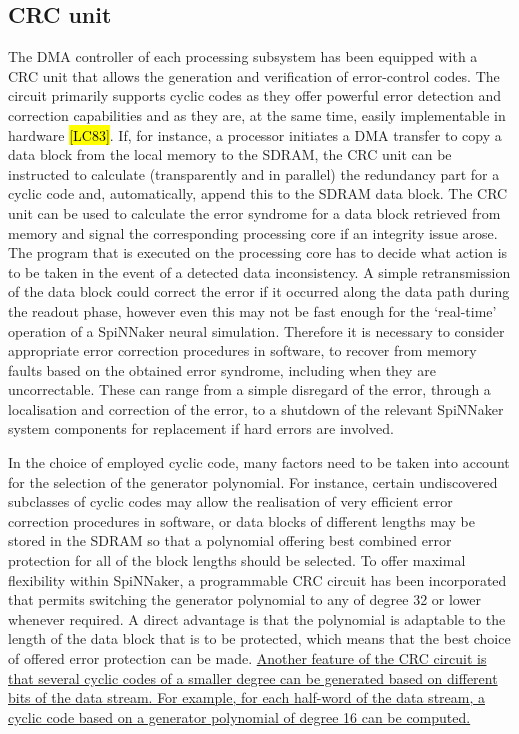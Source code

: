 \documentclass[a4paper, 11pt]{article}
\begin{document}
\subsection{CRC unit}
The DMA controller of each processing subsystem has been equipped with a CRC unit that allows the generation and verification of error-control codes. The circuit primarily supports cyclic codes as they offer powerful error detection and correction capabilities and as they are, at the same time, easily implementable in hardware \hl{[LC83]}. If, for instance, a processor initiates a DMA transfer to copy a data block from the local memory to the SDRAM, the CRC unit can be instructed to calculate (transparently and in parallel) the redundancy part for a cyclic code and, automatically, append this to the SDRAM data block. The CRC unit can be used to calculate the error syndrome for a data block retrieved from memory and signal the corresponding processing core if an integrity issue arose. The program that is executed on the processing core has to decide what action is to be taken in the event of a detected data inconsistency. A simple retransmission of the data block could correct the error if it occurred along the data path during the readout phase, however even this may not be fast enough for the `real-time' operation of a SpiNNaker neural simulation. Therefore it is necessary to consider appropriate error correction procedures in software, to recover from memory faults based on the obtained error syndrome, including when they are uncorrectable. These can range from a simple disregard of the error, through a localisation and correction of the error, to a shutdown of the relevant SpiNNaker system components for replacement if hard errors are involved.

In the choice of employed cyclic code, many factors need to be taken into account for the selection of the generator polynomial. For instance, certain undiscovered subclasses of cyclic codes may allow the realisation of very efficient error correction procedures in software, or data blocks of different lengths may be stored in the SDRAM so that a polynomial offering best combined error protection for all of the block lengths should be selected. To offer maximal flexibility within SpiNNaker, a programmable CRC circuit has been incorporated that permits switching the generator polynomial to any of degree 32 or lower whenever required. A direct advantage is that the polynomial is adaptable to the length of the data block that is to be protected, which means that the best choice of offered error protection can be made. \ul{Another feature of the CRC circuit is that several cyclic codes of a smaller degree can be generated based on different bits of the data stream. For example, for each half-word of the data stream, a cyclic code based on a generator polynomial of degree 16 can be computed.}
\end{document}
